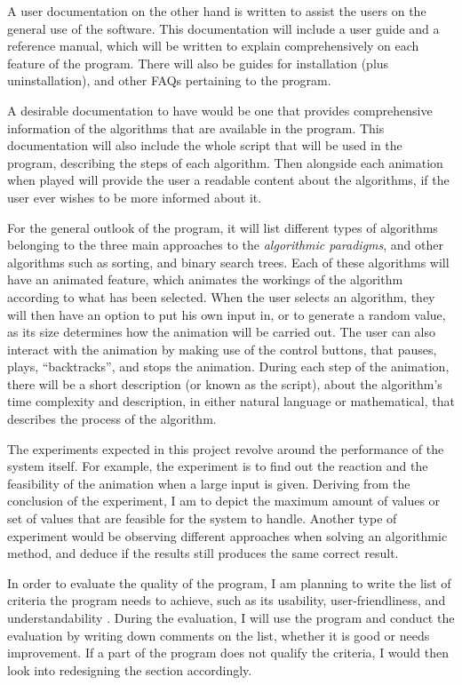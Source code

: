 \documentclass[12pt,a4paper,oneside]{report}
\begin{document}
A user documentation on the other hand is written to assist the users on the general use of the software. This documentation will include a user guide and a reference manual, which will be written to explain comprehensively on each feature of the program. There will also be guides for installation (plus uninstallation), and other FAQs pertaining to the program. 

A desirable documentation to have would be one that provides comprehensive information of the algorithms that are available in the program. This documentation will also include the whole script that will be used in the program, describing the steps of each algorithm. Then alongside each animation when played will provide the user a readable content about the algorithms, if the user ever wishes to be more informed about it.

For the general outlook of the program, it will list different types of algorithms belonging to the three main approaches to the \textit{algorithmic paradigms}, and other algorithms such as sorting, and binary search trees. Each of these algorithms will have an animated feature, which animates the workings of the algorithm according to what has been selected. When the user selects an algorithm, they will then have an option to put his own input in, or to generate a random value, as its size determines how the animation will be carried out. The user can also interact with the animation by making use of the control buttons, that pauses, plays, ``backtracks'', and stops the animation. During each step of the animation, there will be a short description (or known as the script), about the algorithm's time complexity and description, in either natural language or mathematical, that describes the process of the algorithm.

The experiments expected in this project revolve around the performance of the system itself. For example, the experiment is to find out the reaction and the feasibility of the animation when a large input is given. Deriving from the conclusion of the experiment, I am to depict the maximum amount of values or set of values that are feasible for the system to handle. 
Another type of experiment would be observing different approaches when solving an algorithmic method, and deduce if the results still produces the same correct result.

In order to evaluate the quality of the program, I am planning to write the list of criteria the program needs to achieve, such as its usability, user-friendliness, and understandability \nocite{jackson_software_2014}. During the evaluation, I will use the program and conduct the evaluation by writing down comments on the list, whether it is good or needs improvement. If a part of the program does not qualify the criteria, I would then look into redesigning the section accordingly.
\end{document}
